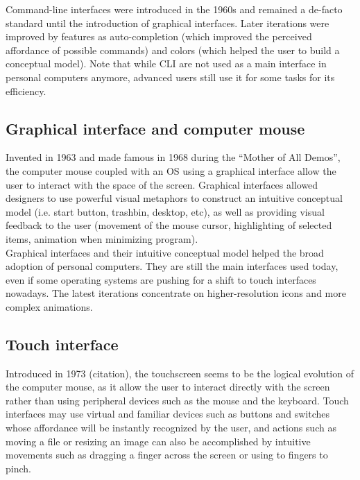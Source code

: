 \documentclass[a4paper,11pt] {article}
\theoremstyle{definition}
\begin{document}
    Command-line interfaces were introduced in the 1960s and remained a de-facto standard until the introduction of graphical interfaces. Later iterations were improved by features as auto-completion (which improved the perceived affordance of possible commands) and colors (which helped the user to build a conceptual model). Note that while CLI are not used as a main interface in personal computers anymore, advanced users still use it for some tasks for its efficiency.

    \subsection{Graphical interface and computer mouse}

    Invented in 1963 and made famous in 1968 during the ``Mother of All Demos''\cite{engelbart1968research}, the computer mouse coupled with an OS using a graphical interface allow the user to interact with the space of the screen. Graphical interfaces allowed designers to use powerful visual metaphors to construct an intuitive conceptual model (i.e. start button, trashbin, desktop, etc), as well as providing visual feedback to the user (movement of the mouse cursor, highlighting of selected items, animation when minimizing program).\\

    Graphical interfaces and their intuitive conceptual model helped the broad adoption of personal computers. They are still the main interfaces used today, even if some operating systems are pushing for a shift to touch interfaces nowadays. The latest iterations concentrate on higher-resolution icons and more complex animations.

    \subsection{Touch interface}

    Introduced in 1973 (citation), the touchscreen seems to be the logical evolution of the computer mouse, as it allow the user to interact directly with the screen rather than using peripheral devices such as the mouse and the keyboard. Touch interfaces may use virtual and familiar devices such as buttons and switches whose affordance will be instantly recognized by the user, and actions such as moving a file or resizing an image can also be accomplished by intuitive movements such as dragging a finger across the screen or using to fingers to pinch.\\
\end{document}
